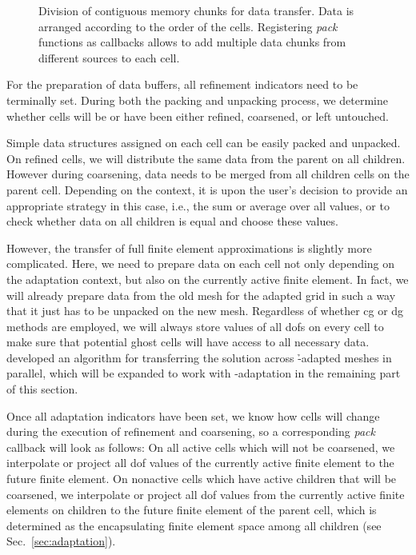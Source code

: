 \begin{figure}
\centering

\caption[Division of contiguous memory chunks for data transfer.]{Division of contiguous memory chunks for data transfer. Data is arranged according to the order of the cells. Registering \textit{pack} functions as callbacks allows to add multiple data chunks from different sources to each cell.}
\label{fig:memory}
\end{figure}

For the preparation of data buffers, all refinement indicators need to be terminally set. During both the packing and unpacking process, we determine whether cells will be or have been either refined, coarsened, or left untouched.

Simple data structures assigned on each cell can be easily packed and unpacked. On refined cells, we will distribute the same data from the parent on all children. However during coarsening, data needs to be merged from all children cells on the parent cell. Depending on the context, it is upon the user's decision to provide an appropriate strategy in this case, i.e., the sum or average over all values, or to check whether data on all children is equal and choose these values.

However, the transfer of full finite element approximations is slightly more complicated. Here, we need to prepare data on each cell not only depending on the adaptation context, but also on the currently active finite element. In fact, we will already prepare data from the old mesh for the adapted grid in such a way that it just has to be unpacked on the new mesh. Regardless of whether \gls{cg} or \gls{dg} methods are employed, we will always store values of all \glspl{dof} on every cell to make sure that potential ghost cells will have access to all necessary data. \textcite{bangerth2012} developed an algorithm for transferring the solution across \h-adapted meshes in parallel, which will be expanded to work with \hp-adaptation in the remaining part of this section.

Once all adaptation indicators have been set, we know how cells will change during the execution of refinement and coarsening, so a corresponding \textit{pack} callback will look as follows: On all active cells which will not be coarsened, we interpolate or project all \gls{dof} values of the currently active finite element to the future finite element. On nonactive cells which have active children that will be coarsened, we interpolate or project all \gls{dof} values from the currently active finite elements on children to the future finite element of the parent cell, which is determined as the encapsulating finite element space among all children (see Sec.~\ref{sec:adaptation}).

